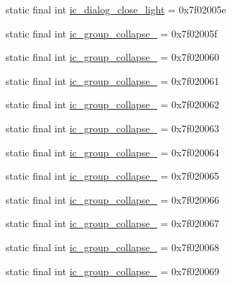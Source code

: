 \begin{CompactItemize}
\item 
static final int \hyperlink{classandroid_1_1support_1_1graphics_1_1drawable_1_1_r_1_1drawable_7af5ef423a1eab69915d2ce2caa692a8}{ic\_\-dialog\_\-close\_\-light} = 0x7f02005e
\item 
static final int \hyperlink{classandroid_1_1support_1_1graphics_1_1drawable_1_1_r_1_1drawable_b45cfde7c5912454e5ff3a63dc44fe31}{ic\_\-group\_\-collapse\_} = 0x7f02005f
\item 
static final int \hyperlink{classandroid_1_1support_1_1graphics_1_1drawable_1_1_r_1_1drawable_930def9fad7e29aa977d792e568fc8f2}{ic\_\-group\_\-collapse\_} = 0x7f020060
\item 
static final int \hyperlink{classandroid_1_1support_1_1graphics_1_1drawable_1_1_r_1_1drawable_2bffcdc486048a60044bc40871dc6856}{ic\_\-group\_\-collapse\_} = 0x7f020061
\item 
static final int \hyperlink{classandroid_1_1support_1_1graphics_1_1drawable_1_1_r_1_1drawable_5bfbc1b508ea3d1b5ff172c14729cece}{ic\_\-group\_\-collapse\_} = 0x7f020062
\item 
static final int \hyperlink{classandroid_1_1support_1_1graphics_1_1drawable_1_1_r_1_1drawable_63d9916946b692f336aa7d02f62b9ae0}{ic\_\-group\_\-collapse\_} = 0x7f020063
\item 
static final int \hyperlink{classandroid_1_1support_1_1graphics_1_1drawable_1_1_r_1_1drawable_5ebe1d02d91b5af3413e7feb61cfa654}{ic\_\-group\_\-collapse\_} = 0x7f020064
\item 
static final int \hyperlink{classandroid_1_1support_1_1graphics_1_1drawable_1_1_r_1_1drawable_22291954044339f2f3902255872296b5}{ic\_\-group\_\-collapse\_} = 0x7f020065
\item 
static final int \hyperlink{classandroid_1_1support_1_1graphics_1_1drawable_1_1_r_1_1drawable_6a4f36990a22c1dd12ffa18e2a3c49b9}{ic\_\-group\_\-collapse\_} = 0x7f020066
\item 
static final int \hyperlink{classandroid_1_1support_1_1graphics_1_1drawable_1_1_r_1_1drawable_eba44523f6a9581118948846f79712b1}{ic\_\-group\_\-collapse\_} = 0x7f020067
\item 
static final int \hyperlink{classandroid_1_1support_1_1graphics_1_1drawable_1_1_r_1_1drawable_5dab5d30bb1c6ef03fb51a040e6b59b5}{ic\_\-group\_\-collapse\_} = 0x7f020068
\item 
static final int \hyperlink{classandroid_1_1support_1_1graphics_1_1drawable_1_1_r_1_1drawable_171e779d29e54b6af68e9896777bfdbc}{ic\_\-group\_\-collapse\_} = 0x7f020069

\end{CompactItemize}

